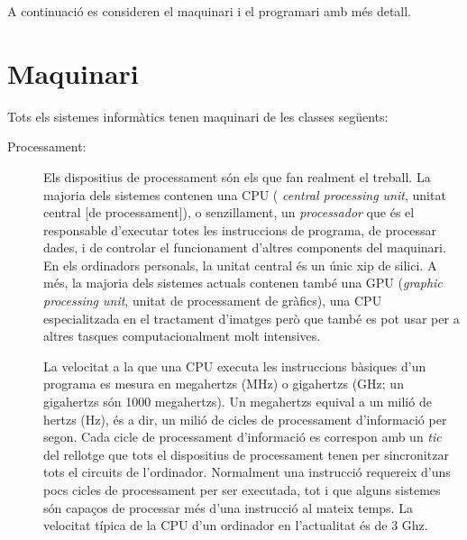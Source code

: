 A continuació es consideren el maquinari i el programari amb més
detall.

\section{Maquinari}

Tots els sistemes informàtics tenen maquinari de les classes següents:

\begin{description}
\item[Processament:] Els dispositius de processament són els que fan
  realment el treball. La majoria dels sistemes contenen una CPU ({\em
    central processing unit}, unitat central [de processament]), o
  senzillament, un \emph{processador} que és el responsable d'executar
  totes les instruccions de programa, de processar dades, i de
  controlar el funcionament d'altres components del maquinari. En els
  ordinadors personals, la unitat central és un únic xip de silici. A
  més, la majoria dels sistemes actuals contenen també una GPU
  (\emph{graphic processing unit}, unitat de processament de gràfics),
  una CPU especialitzada en el tractament d'imatges però que també es
  pot usar per a altres tasques computacionalment molt intensives.

  La velocitat a la que una CPU executa les instruccions bàsiques d'un
  programa es mesura en megahertzs (MHz) o gigahertzs (GHz; un
  gigahertzs són 1000 megahertzs). Un megahertzs equival a un milió de
  hertzs (Hz), és a dir, un milió de cicles de processament
  d'informació per segon. Cada cicle de processament d'informació es
  correspon amb un \emph{tic} del rellotge que tots el dispositius de
  processament tenen per sincronitzar tots el circuits de
  l'ordinador. Normalment una instrucció requereix d'uns pocs cicles
  de processament per ser executada, tot i que alguns sistemes són
  capaços de processar més d'una instrucció al mateix temps. La
  velocitat típica de la CPU d'un ordinador en l'actualitat és de 3
  Ghz.
  

\end{description}

